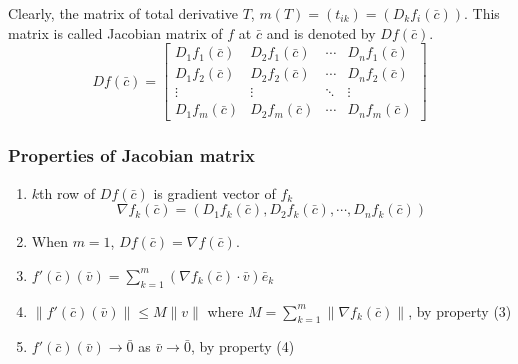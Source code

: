 Clearly, the matrix of total derivative $T$, $m(T) = (t_{ik}) = (D_k f_i(\bar{c}))$.
This matrix is called Jacobian matrix of $f$ at $\bar{c}$ and is denoted by $Df(\bar{c})$.
\[ Df(\bar{c}) = \begin{bmatrix} D_1 f_1(\bar{c}) & D_2 f_1(\bar{c}) & \cdots & D_n f_1(\bar{c}) \\ D_1 f_2(\bar{c}) & D_2 f_2(\bar{c}) & \cdots & D_n f_2(\bar{c}) \\ \vdots & \vdots & \ddots & \vdots \\ D_1 f_m(\bar{c}) & D_2 f_m(\bar{c}) & \cdots & D_n f_m(\bar{c}) \end{bmatrix} \]

\subsubsection{Properties of Jacobian matrix}
\begin{enumerate}
	\item $k$th row of $Df(\bar{c})$ is gradient vector of $f_k$
		\[\nabla f_k(\bar{c}) = (D_1f_k(\bar{c}),D_2f_k(\bar{c}),\cdots,D_nf_k(\bar{c}))\]
	\item When $m = 1$, $Df(\bar{c}) = \nabla f(\bar{c})$.
	\item $f'(\bar{c})(\bar{v}) = \sum\limits_{k=1}^m \left(\nabla f_k(\bar{c}) \cdot \bar{v}\right) \bar{e}_k$
	\item $\|f'(\bar{c})(\bar{v})\| \le M\|v\|$ where $M = \sum\limits_{k=1}^m \|\nabla f_k(\bar{c})\| $, by property (3)
	\item $f'(\bar{c})(\bar{v}) \to \bar{0}$ as $\bar{v} \to \bar{0}$, by property (4)
\end{enumerate}

